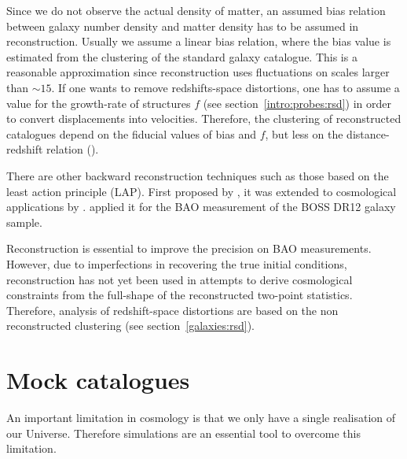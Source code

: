 Since we do not observe the actual density of matter, an assumed bias relation between galaxy number density 
and matter density has to be assumed in reconstruction. Usually we assume a linear bias relation, where the 
bias value is estimated from the clustering of the standard galaxy catalogue. This is a reasonable approximation 
since reconstruction uses fluctuations on scales larger than $\sim 15$\hmpc. 
If one wants to remove redshifts-space distortions, one has to assume a value for the growth-rate of structures $f$
(see section~\ref{intro:probes:rsd}) in order to convert displacements into velocities. 
Therefore, the clustering of reconstructed catalogues depend on the fiducial values of bias and $f$, 
but less on the distance-redshift relation (\cite{carterImpactFiducialCosmology2020}). 

There are other backward reconstruction techniques such as those based on the least action principle (LAP).
First proposed by \cite{peeblesTracingGalaxyOrbits1989}, it was extended to cosmological applications 
by \cite{nusserLeastActionPrinciple2000, sarpaBAOReconstructionSwift2019}. 
\cite{sarpaExtendedFastAction2021} applied it for the BAO measurement of the BOSS DR12 galaxy sample. 

Reconstruction is essential to improve the precision on BAO measurements. However, 
due to imperfections in recovering the true initial conditions, 
reconstruction has not yet been used in attempts to derive cosmological 
constraints from the full-shape of the reconstructed two-point statistics.
Therefore, analysis of redshift-space distortions are based on the non reconstructed 
clustering (see section~\ref{galaxies:rsd}).  

\section{Mock catalogues}
\label{galaxies:mocks}

An important limitation in cosmology is that we only have a single realisation of our Universe. 
Therefore simulations are an essential tool to overcome this limitation. 

